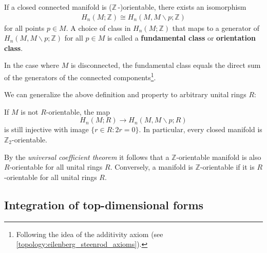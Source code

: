     \begin{property}[Orientability]\label{diff:orientation_class}
        If a closed connected manifold is ($\mathbb{Z}\,$-)orientable, there exists an isomorphism
        \begin{gather}
            H_n(M;\mathbb{Z})\cong H_n(M, M\backslash p;\mathbb{Z})
        \end{gather}
        for all points $p\in M$. A choice of class in $H_n(M;\mathbb{Z})$ that maps to a generator of $H_n(M, M\backslash p;\mathbb{Z})$ for all $p\in M$ is called a \textbf{fundamental class} or \textbf{orientation class}.

        In the case where $M$ is disconnected, the fundamental class equals the direct sum of the generators of the connected components\footnote{Following the idea of the additivity axiom (see \ref{topology:eilenberg_steenrod_axioms}).}.
    \end{property}
    We can generalize the above definition and property to arbitrary unital rings $R$:

    \begin{property}
        If $M$ is not $R$-orientable, the map \[H_n(M;R)\rightarrow H_n(M, M\backslash p;R)\] is still injective with image $\{r\in R:2r=0\}$. In particular, every closed manifold is $\mathbb{Z}_2$-orientable.
    \end{property}

    \begin{property}
        By the \textit{universal coefficient theorem} it follows that a $\mathbb{Z}$-orientable manifold is also $R$-orientable for all unital rings $R$. Conversely, a manifold is $\mathbb{Z}$-orientable if it is $R$-orientable for all unital rings $R$.
    \end{property}

\subsection{Integration of top-dimensional forms}


